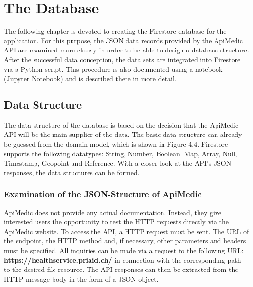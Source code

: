 
\chapter{The Database}
The following chapter is devoted to creating the Firestore database for the application. For this purpose, the JSON data records provided by the ApiMedic API are examined more closely in order to be able to design a database structure. After the successful data conception, the data sets are integrated into Firestore via a Python script. This procedure is also documented using a notebook (Jupyter Notebook) and is described there in more detail.

\section{Data Structure}
The data structure of the database is based on the decision that the ApiMedic API will be the main supplier of the data. The basic data structure can already be guessed from the domain model, which is shown in Figure 4.4. Firestore supports the following datatypes: String, Number, Boolean, Map, Array, Null, Timestamp, Geopoint and Reference. With a closer look at the API's JSON responses, the data structures can be formed.

\subsection{Examination of the JSON-Structure of ApiMedic}
ApiMedic does not provide any actual documentation. Instead, they give interested users the opportunity to test the HTTP requests directly via the ApiMedic website. To access the API, a HTTP request must be sent. The URL of the endpoint, the HTTP method and, if necessary, other parameters and headers must be specified. All inquiries can be made via a request to the following URL: \textbf{https://healthservice.priaid.ch/} in connection with the corresponding path to the desired file resource. The API responses can then be extracted from the HTTP message body in the form of a JSON object.

